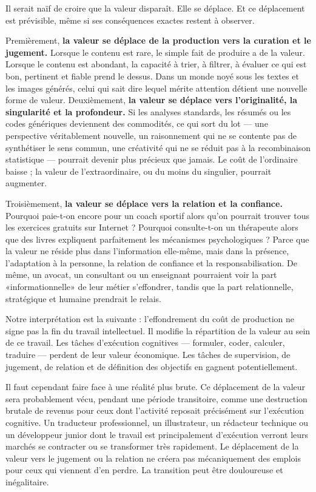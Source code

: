 Il serait naïf de croire que la valeur disparaît. Elle se déplace. Et ce déplacement est prévisible, même si ses conséquences exactes restent à observer.

Premièrement, \textbf{la valeur se déplace de la production vers la curation et le jugement.} Lorsque le contenu est rare, le simple fait de produire a de la valeur. Lorsque le contenu est abondant, la capacité à trier, à filtrer, à évaluer ce qui est bon, pertinent et fiable prend le dessus. Dans un monde noyé sous les textes et les images générés, celui qui sait dire lequel mérite attention détient une nouvelle forme de valeur. Deuxièmement, \textbf{la valeur se déplace vers l'originalité, la singularité et la profondeur.} Si les analyses standards, les résumés ou les codes génériques deviennent des commodités, ce qui sort du lot — une perspective véritablement nouvelle, un raisonnement qui ne se contente pas de synthétiser le sens commun, une créativité qui ne se réduit pas à la recombinaison statistique — pourrait devenir plus précieux que jamais. Le coût de l'ordinaire baisse ; la valeur de l'extraordinaire, ou du moins du singulier, pourrait augmenter.

Troisièmement, \textbf{la valeur se déplace vers la relation et la confiance.} Pourquoi paie-t-on encore pour un coach sportif alors qu'on pourrait trouver tous les exercices gratuits sur Internet ? Pourquoi consulte-t-on un thérapeute alors que des livres expliquent parfaitement les mécanismes psychologiques ? Parce que la valeur ne réside plus dans l'information elle-même, mais dans la présence, l'adaptation à la personne, la relation de confiance et la responsabilisation. De même, un avocat, un consultant ou un enseignant pourraient voir la part «informationnelle» de leur métier s'effondrer, tandis que la part relationnelle, stratégique et humaine prendrait le relais.

Notre interprétation est la suivante : l'effondrement du coût de production ne signe pas la fin du travail intellectuel. Il modifie la répartition de la valeur au sein de ce travail. Les tâches d'exécution cognitives — formuler, coder, calculer, traduire — perdent de leur valeur économique. Les tâches de supervision, de jugement, de relation et de définition des objectifs en gagnent potentiellement.

Il faut cependant faire face à une réalité plus brute. Ce déplacement de la valeur sera probablement vécu, pendant une période transitoire, comme une destruction brutale de revenus pour ceux dont l'activité reposait précisément sur l'exécution cognitive. Un traducteur professionnel, un illustrateur, un rédacteur technique ou un développeur junior dont le travail est principalement d'exécution verront leurs marchés se contracter ou se transformer très rapidement. Le déplacement de la valeur vers le jugement ou la relation ne créera pas mécaniquement des emplois pour ceux qui viennent d'en perdre. La transition peut être douloureuse et inégalitaire.

